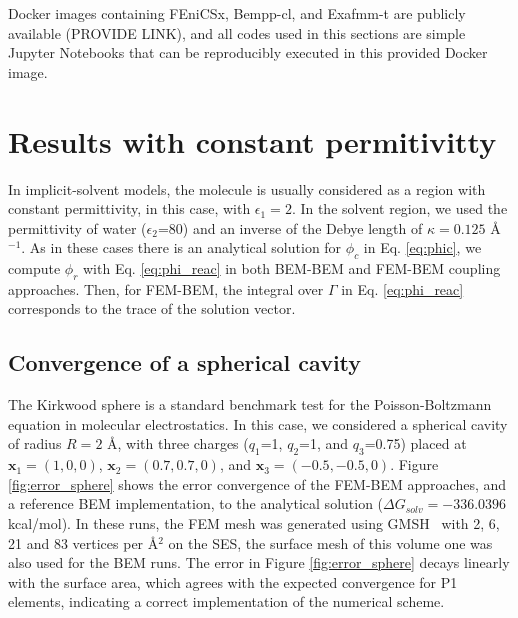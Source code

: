 Docker images containing FEniCSx, Bempp-cl, and Exafmm-t are publicly available (PROVIDE LINK), and all codes used in this sections are simple Jupyter Notebooks that can be reproducibly executed in this provided Docker image.

\section*{\sffamily \Large Results with constant permitivitty}

In implicit-solvent models, the molecule is usually considered as a region with constant permittivity, in this case, with $\epsilon_1=2$.
In the solvent region, we used the permittivity of water ($\epsilon_2$=80) and an inverse of the Debye length of $\kappa=0.125$ \AA$^{-1}$.
As in these cases there is an analytical solution for $\phi_c$ in Eq. \eqref{eq:phic}, we compute $\phi_r$ with Eq. \eqref{eq:phi_reac} in both BEM-BEM and FEM-BEM coupling approaches. Then, for FEM-BEM, the integral over $\Gamma$ in Eq. \eqref{eq:phi_reac} corresponds to the trace of the solution vector.

\subsection*{\sffamily \large Convergence of a spherical cavity}

The Kirkwood sphere \cite{Kirkwood1934} is a standard benchmark test for the Poisson-Boltzmann equation in molecular electrostatics. 
In this case, we considered a spherical cavity of radius $R=2$ \AA, with three charges ($q_1$=1, $q_2$=1, and $q_3$=0.75) placed at $\mathbf{x}_1=(1,0,0)$, $\mathbf{x}_2=(0.7,0.7,0)$, and $\mathbf{x}_3=(-0.5,-0.5,0)$.
Figure \ref{fig:error_sphere} shows the error convergence of the FEM-BEM approaches, and a reference BEM implementation, to the analytical solution ($\Delta G_{solv}= -336.0396$ kcal/mol). 
In these runs, the FEM mesh was generated using GMSH~\cite{geuzaine2009gmsh} 
with %
2, 6, 21 and 83 vertices per \AA$^2$ on the SES, the surface mesh of this volume one was also used for the BEM runs. 
The error in Figure \ref{fig:error_sphere} decays linearly with the surface area, which agrees with the expected convergence for P1 elements, indicating a correct implementation of the numerical scheme. 

